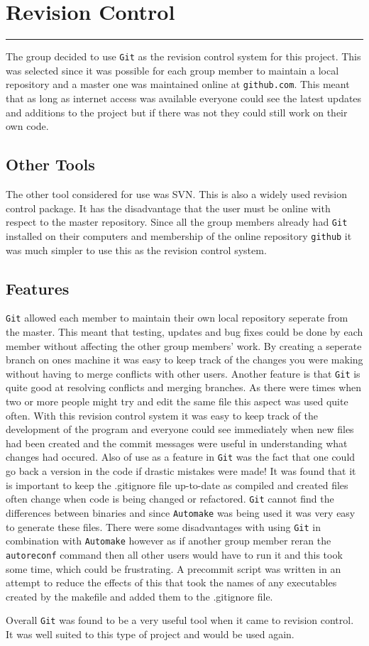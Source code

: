 \section{Revision Control}
\vspace{-2em}\rule{\textwidth}{1pt}\vspace{1em}

The group decided to use \texttt{Git} as the revision control system for this project.
This was selected since it was possible for each group member to maintain a local repository and a master one was maintained online at \texttt{github.com}.
This meant that as long as internet access was available everyone could see the latest updates and additions to the project but if there was not they could still work on their own code.

\subsection{Other Tools}
The other tool considered for use was SVN.
This is also a widely used revision control package.
It has the disadvantage that the user must be online with respect to the master repository.
Since all the group members already had \texttt{Git} installed on their computers and membership of the online repository \texttt{github} it was much simpler to use this as the revision control system.

\subsection{Features}
\texttt{Git} allowed each member to maintain their own local repository seperate from the master.
This meant that testing, updates and bug fixes could be done by each member without affecting the other group members' work.
By creating a seperate branch on ones machine it was easy to keep track of the changes you were making without having to merge conflicts with other users.
Another feature is that \texttt{Git} is quite good at resolving conflicts and merging branches.
As there were times when two or more people might try and edit the same file this aspect was used quite often.
With this revision control system it was easy to keep track of the development of the program and everyone could see immediately when new files had been created and the commit messages were useful in understanding what changes had occured.
Also of use as a feature in \texttt{Git} was the fact that one could go back a version in the code if drastic mistakes were made!
It was found that it is important to keep the .gitignore file up-to-date as compiled and created files often change when code is being changed or refactored.
\texttt{Git} cannot find the differences between binaries and since \texttt{Automake} was being used it was very easy to generate these files.
There were some disadvantages with using \texttt{Git} in combination with \texttt{Automake} however as if another group member reran the \texttt{autoreconf} command then all other users would have to run it and this took some time, which could be frustrating.
A precommit script was written in an attempt to reduce the effects of this that took the names of any executables created by the makefile and added them to the .gitignore file.

Overall \texttt{Git} was found to be a very useful tool when it came to revision control.
It was well suited to this type of project and would be used again.

